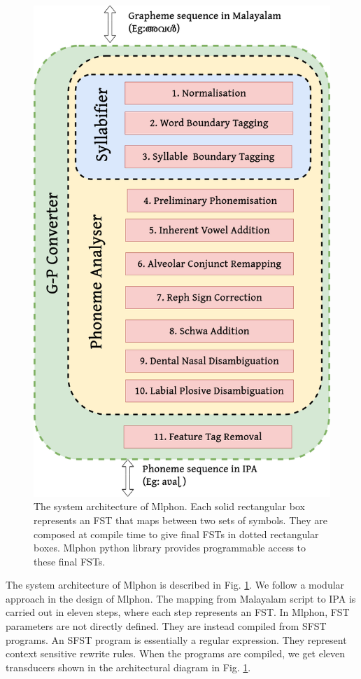\documentclass{ieeeaccess}
\begin{document}
\begin{figure}[!h]
	\centering
	\includegraphics[width=0.9\linewidth]{g2p.png}
	\caption{The system architecture of Mlphon. Each solid rectangular box represents an FST that maps between two sets of symbols. They are composed at compile time to give final FSTs in dotted rectangular boxes. Mlphon python library provides programmable access to these final FSTs.}
	\label{architecture}
\end{figure}

The system architecture of Mlphon is described in Fig. \ref{architecture}. We follow a modular approach in the design of Mlphon. The mapping from Malayalam script to IPA is carried out in eleven steps, where each step represents an FST. In Mlphon, FST parameters are not directly defined. They are instead compiled from SFST programs. An SFST program is essentially a regular expression.  They represent context sensitive rewrite rules.  When the programs are compiled, we get eleven transducers shown in the architectural diagram in Fig. \ref{architecture}.
\end{document}
